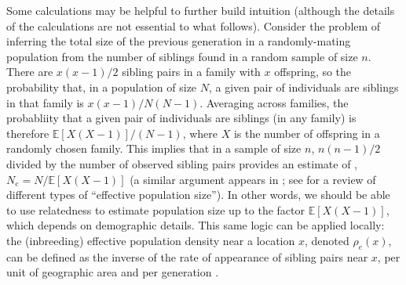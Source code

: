 \documentclass{ar-1col}
\newcommand{\g}[1]{{\color{blue}{#1}}}
\renewcommand{\emph}[1]{{\textit{#1}}}
\newcommand{\E}{\mathbb{E}}
\newcommand{\details}[1]{}
\begin{document}
Some calculations may be helpful to further build intuition
(although the details of the calculations are not essential to what follows).
Consider the problem of inferring the total size of the previous generation
in a randomly-mating population
from the number of siblings found in a random sample of size $n$.
There are $x (x-1) / 2$ sibling pairs in a family with $x$ offspring,
so the probability that, 
in a population of size $N$, 
a given pair of individuals are siblings in that family is $x(x-1)/N(N-1)$.
Averaging across families, the probabliity that a given pair of individuals
are siblings (in any family)
is therefore $\E[X (X-1)] / (N-1)$, where $X$ is the number of offspring in a randomly chosen family.
This implies that in a sample of size $n$,
$n(n-1)/2$ divided by the number of observed sibling pairs 
provides an estimate of \g{(inbreeding) \emph{effective population size}}, 
$N_e = N/\E[X(X-1)]$ 
(a similar argument appears in \citet{mohle2003cpd}; 
see \citet{wang2016prediction} for a review of different types of ``effective population size''). \g{also Cworth2009?}
In other words, we should be able to use relatedness to estimate population size
up to the factor $\E[X(X-1)]$, which depends on demographic details. 
This same logic can be applied locally:
the (inbreeding) effective population density
near a location $x$, denoted $\rho_e(x)$,
can be defined as the inverse of the rate of appearance of sibling pairs
near $x$, per unit of geographic area and per generation \citep{barton-depaulis-etheridge}.
\g{(Inbreeding effective size is usually defined in terms of the probability of identity;
this is related because full sibs have inherited from the same parental chromosome on half their genome.)}

\details{
Let $P$ denote the probability that two diploids sampled from the population are siblings, and
let $Q$be the probability that randomly sampled chromosomes from two randomly sampled diploids inherit from the same parental chromosome at a randomly chosen locus.
Claim: Assuming monogamy (no half-sibs), $1/P$ is ``diploid inbreeding $N_e$'', 
defined (in \citet{ewens2004mpg}) to be $1/(2Q)$.  
(Note the caveats about diploidy do not appear in Ewens.)
Proof: Under monogamy, the chance a random locus on random chromosomes from the two diploids are IBD from a common parent is $1/2$, so $Q = P/2$.
}
\end{document}
